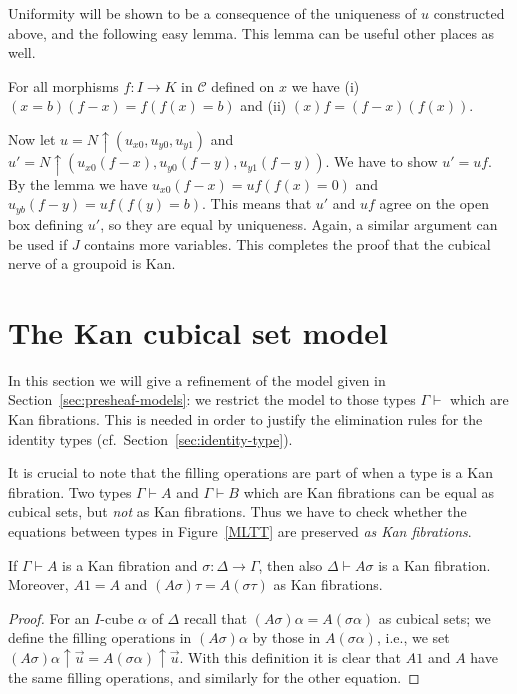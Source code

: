 \documentclass[10pt,a4paper]{article}
\newcommand{\CC}{{\mathcal C}}
\newcommand{\rup}[1]{#1{\uparrow}}
\begin{document}
Uniformity will be shown to be a consequence of the uniqueness of
$u$ constructed above, and the following easy lemma.
This lemma can be useful other places as well.
\begin{lemma}  For all morphisms $f:I\to K$ in $\CC$ defined on $x$ we have
(i) $(x=b)(f-x) = f (f(x)=b)$ and (ii) $(x)f = (f-x)(f(x))$.
\end{lemma}
Now let $u=\rup{N}(u_{x0},u_{y0},u_{y1})$ and
$u'=\rup{N}(u_{x0}(f-x),u_{y0}(f-y),u_{y1}(f-y))$.
We have to show $u'=uf$.
By the lemma we have $u_{x0}(f-x) = uf(f(x)=0)$ and $u_{yb}(f-y) = uf(f(y)=b)$.
This means that $u'$ and $uf$ agree on the open box defining $u'$,
so they are equal by uniqueness.
Again, a similar argument can be used if $J$ contains more variables.
This completes the proof that the cubical nerve of a groupoid is Kan.

\section{The Kan cubical set model}\label{sec:kancubsetmodel}


In this section we will give a refinement of the model given in
Section~\ref{sec:presheaf-models}: we restrict the model to those
types $\Gamma \vdash$ which are Kan fibrations.  This is needed in
order to justify the elimination rules for the identity types (cf.\
Section~\ref{sec:identity-type}).

It is crucial to note that the filling operations are part of when a
type is a Kan fibration.  Two types $\Gamma \vdash A$ and $\Gamma
\vdash B$ which are Kan fibrations can be equal as cubical sets, but
\emph{not} as Kan fibrations.  Thus we have to check whether the
equations between types in Figure~\ref{MLTT} are preserved \emph{as Kan
  fibrations}.

\begin{theorem}
  If $\Gamma \vdash A$ is a Kan fibration and $\sigma \colon \Delta
  \to \Gamma$, then also $\Delta \vdash A \sigma$ is a Kan fibration.
  Moreover, $A 1 = A$ and $(A \sigma) \tau = A (\sigma \tau)$ as Kan
  fibrations.
\end{theorem}
\begin{proof}
  For an $I$-cube $\alpha$ of $\Delta$ recall that $(A \sigma) \alpha
  = A (\sigma \alpha)$ as cubical sets; we define the filling
  operations in $(A \sigma) \alpha$ by those in $A (\sigma \alpha)$,
  i.e., we set $\rup{(A \sigma) \alpha} {\vec u} = \rup {A (\sigma
    \alpha)} {\vec u}$.  With this definition it is clear that $A 1$
  and $A$ have the same filling operations, and similarly for the
  other equation.
\end{proof}
\end{document}
